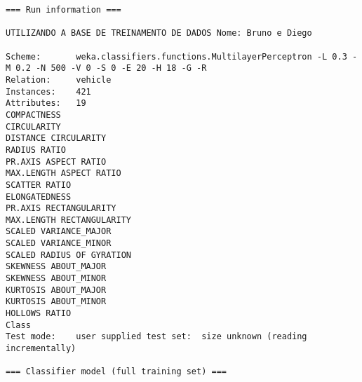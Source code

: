\documentclass[
	article,			%
	11pt,				%
	oneside,			%
	a4paper,			%
	english,			%
	brazil,				%
	sumario=tradicional
	]{abntex2}
\begin{document}
\begin{lstlisting}
=== Run information ===

UTILIZANDO A BASE DE TREINAMENTO DE DADOS Nome: Bruno e Diego

Scheme:       weka.classifiers.functions.MultilayerPerceptron -L 0.3 -M 0.2 -N 500 -V 0 -S 0 -E 20 -H 18 -G -R
Relation:     vehicle
Instances:    421
Attributes:   19
COMPACTNESS
CIRCULARITY
DISTANCE CIRCULARITY
RADIUS RATIO
PR.AXIS ASPECT RATIO
MAX.LENGTH ASPECT RATIO
SCATTER RATIO
ELONGATEDNESS
PR.AXIS RECTANGULARITY
MAX.LENGTH RECTANGULARITY
SCALED VARIANCE_MAJOR
SCALED VARIANCE_MINOR
SCALED RADIUS OF GYRATION
SKEWNESS ABOUT_MAJOR
SKEWNESS ABOUT_MINOR
KURTOSIS ABOUT_MAJOR
KURTOSIS ABOUT_MINOR
HOLLOWS RATIO
Class
Test mode:    user supplied test set:  size unknown (reading incrementally)

=== Classifier model (full training set) ===


\end{lstlisting}
\end{document}
